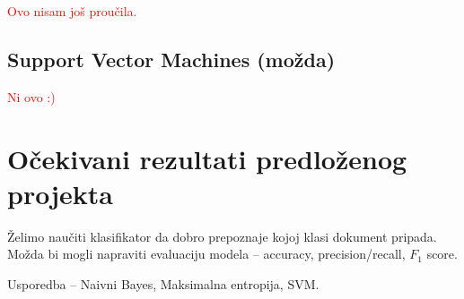 \documentclass[12pt,a4paper,titlepage]{article}
\begin{document}
\textcolor{red}{Ovo nisam još proučila.}

\subsection{Support Vector Machines (možda)}

\textcolor{red}{Ni ovo :)}

\section{Očekivani rezultati predloženog projekta}

Želimo naučiti klasifikator da dobro prepoznaje kojoj klasi dokument pripada. Možda bi mogli napraviti evaluaciju modela -- accuracy, precision/recall, $F_1$ score.

Usporedba -- Naivni Bayes, Maksimalna entropija, SVM.

\newpage

\nocite{*}



\end{document}
